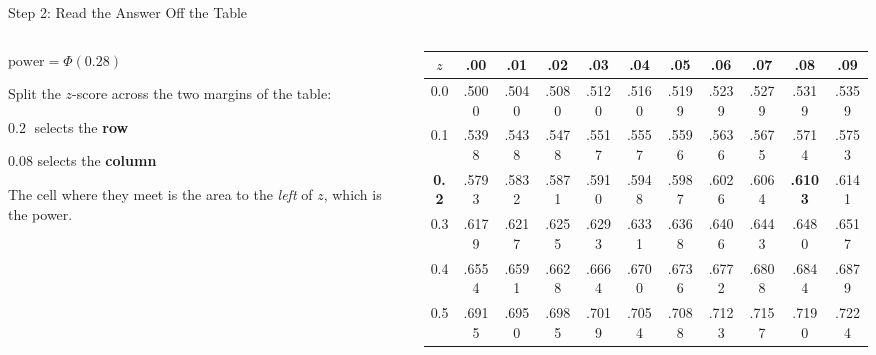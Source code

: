 \documentclass[
  ignorenonframetext,
  aspectratio=169,
]{beamer}
\begin{document}
\begin{frame}{Step 2: Read the Answer Off the Table}
\label{step-2-read-the-answer-off-the-table}
\begin{columns}[T]

\begin{column}{0.30\textwidth}
\vspace{0.6em}

\begin{center}
$\text{power} = \Phi(\mathbf{0.28})$
\end{center}

\vspace{0.5em}

\footnotesize
Split the $z$-score across the two margins of the table:

\vspace{0.4em}

\hspace{0.5em}$\mathbf{0.2}\;$ selects the \textbf{row}

\vspace{0.2em}

\hspace{0.5em}$\mathbf{0.08}$ selects the \textbf{column}

\vspace{0.5em}

The cell where they meet is the area to the \textit{left} of $z$, which is the power.
\end{column}

\begin{column}{0.70\textwidth}
\begin{center}
\scriptsize
\setlength{\tabcolsep}{2.4pt}
\renewcommand{\arraystretch}{1.25}
\begin{tabular}{c|cccccccccc}
\toprule
$z$ & .00 & .01 & .02 & .03 & .04 & .05 & .06 & .07 & \cellcolor{stataccbg}\textbf{.08} & .09 \\
\midrule
0.0 & .5000 & .5040 & .5080 & .5120 & .5160 & .5199 & .5239 & .5279 & \cellcolor{stataccbg}.5319 & .5359 \\
0.1 & .5398 & .5438 & .5478 & .5517 & .5557 & .5596 & .5636 & .5675 & \cellcolor{stataccbg}.5714 & .5753 \\
\cellcolor{stataccbg}\textbf{0.2} & \cellcolor{stataccbg}.5793 & \cellcolor{stataccbg}.5832 & \cellcolor{stataccbg}.5871 & \cellcolor{stataccbg}.5910 & \cellcolor{stataccbg}.5948 & \cellcolor{stataccbg}.5987 & \cellcolor{stataccbg}.6026 & \cellcolor{stataccbg}.6064 & \cellcolor{statorange}\textbf{\color{white}.6103} & \cellcolor{stataccbg}.6141 \\
0.3 & .6179 & .6217 & .6255 & .6293 & .6331 & .6368 & .6406 & .6443 & \cellcolor{stataccbg}.6480 & .6517 \\
0.4 & .6554 & .6591 & .6628 & .6664 & .6700 & .6736 & .6772 & .6808 & \cellcolor{stataccbg}.6844 & .6879 \\
0.5 & .6915 & .6950 & .6985 & .7019 & .7054 & .7088 & .7123 & .7157 & \cellcolor{stataccbg}.7190 & .7224 \\
\bottomrule
\end{tabular}
\end{center}
\end{column}


\end{columns}
\end{frame}
\end{document}
